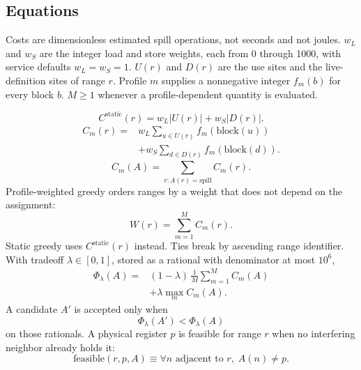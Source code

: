 \documentclass{ieeeaccess}
\begin{document}
\subsection{Equations}
\label{sec:equations}
Costs are dimensionless estimated spill operations, not seconds and not joules.
$w_L$ and $w_S$ are the integer load and store weights, each from 0 through 1000, with service defaults $w_L = w_S = 1$.
$U(r)$ and $D(r)$ are the use sites and the live-definition sites of range $r$.
Profile $m$ supplies a nonnegative integer $f_m(b)$ for every block $b$.
$M \geq 1$ whenever a profile-dependent quantity is evaluated.

\begin{equation}
\label{eq:static}
C^{\mathrm{static}}(r) = w_L \lvert U(r)\rvert + w_S \lvert D(r)\rvert.
\end{equation}
\begin{equation}
\label{eq:profile}
\begin{aligned}
C_m(r) ={}& w_L \sum_{u \in U(r)} f_m(\mathrm{block}(u)) \\
&+ w_S \sum_{d \in D(r)} f_m(\mathrm{block}(d)).
\end{aligned}
\end{equation}
\begin{equation}
\label{eq:alloc}
C_m(A) = \sum_{r : A(r)=\mathrm{spill}} C_m(r).
\end{equation}
Profile-weighted greedy orders ranges by a weight that does not depend on the assignment:
\begin{equation}
\label{eq:weight}
W(r) = \sum_{m=1}^{M} C_m(r).
\end{equation}
Static greedy uses $C^{\mathrm{static}}(r)$ instead.
Ties break by ascending range identifier.
With tradeoff $\lambda \in [0,1]$, stored as a rational with denominator at most $10^6$,
\begin{equation}
\label{eq:potential}
\begin{aligned}
\Phi_\lambda(A) ={}& (1-\lambda)\,\frac{1}{M}\sum_{m=1}^{M} C_m(A) \\
&+ \lambda \max_{m} C_m(A).
\end{aligned}
\end{equation}
A candidate $A'$ is accepted only when
\begin{equation}
\label{eq:accept}
\Phi_\lambda(A') < \Phi_\lambda(A)
\end{equation}
on those rationals.
A physical register $p$ is feasible for range $r$ when no interfering neighbor already holds it:
\begin{equation}
\label{eq:feasible}
\mathrm{feasible}(r,p,A) \equiv \forall n \text{ adjacent to } r,\; A(n) \neq p.
\end{equation}
\end{document}
